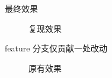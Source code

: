 \documentclass[notheorems,xetex]{beamer}
\begin{document}
\begin{frame}{最终效果}
\begin{figure}
\caption{复现效果}
\end{figure}
\begin{center}
feature 分支仅贡献一处改动
\end{center}
\begin{figure}
	\caption{原有效果}
\end{figure}
\end{frame}




\end{document}
